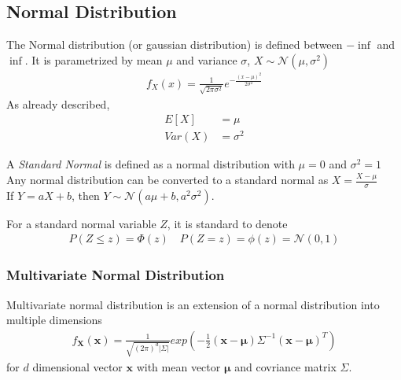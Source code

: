 \documentclass[../../probability-notes.tex]{subfiles}
\begin{document}
    \subsection{Normal Distribution}
    The Normal distribution (or gaussian distribution) is defined between $-\inf$ and $\inf$. It is parametrized by mean $\mu$ and variance $\sigma$, $X \sim \mathcal{N}(\mu, \sigma^{2})$
    \begin{align*}
        f_{X}(x) = \frac{1}{\sqrt{2\pi \sigma^{2}}} e^{-\frac{(x-\mu)^{2}}{2 \sigma^{2}}}
    \end{align*}
    As already described,
    \begin{align*}
        E[X] &= \mu\\
        Var(X) &= \sigma^{2}
    \end{align*}

    A \emph{Standard Normal} is defined as a normal distribution with $\mu = 0$ and $\sigma^{2} = 1$\\
    Any normal distribution can be converted to a standard normal as $X = \frac{X - \mu}{\sigma}$\\
    If $Y = aX + b$, then $Y \sim \mathcal{N}(a \mu + b, a^{2}\sigma^{2})$.\newline

    For a standard normal variable $Z$, it is standard to denote
    \begin{align*}
        P(Z \leq z) = \Phi(z) \quad P(Z = z) = \phi(z) = \mathcal{N}(0,1)
    \end{align*}

    \subsubsection{Multivariate Normal Distribution}
    Multivariate normal distribution is an extension of a normal distribution into multiple dimensions
    \begin{align*}
        f_{\mathbf{X}}(\bm{x}) = \frac{1}{\sqrt{(2\pi)^{d} \lvert \Sigma \rvert}} exp(-\frac{1}{2}(\mathbf{x} - \bm{\mu})\Sigma^{-1}(\mathbf{x} - \bm{\mu})^{T})
    \end{align*}
    for $d$ dimensional vector $\mathbf{x}$ with mean vector $\bm{\mu}$ and covriance matrix $\Sigma$.
\end{document}

